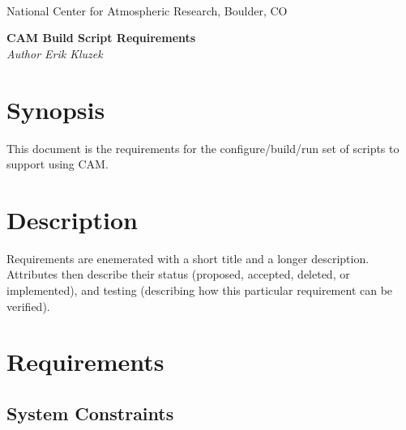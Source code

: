 \documentclass[]{article}
\begin{document}

\begin{titlepage}

\begin{latexonly}
 \\
\noindent National Center for Atmospheric Research, Boulder, CO \\
\vspace{2in}
\end{latexonly}

\begin{center}
{\Large\bf CAM Build Script Requirements} \\
\medskip
{\it Author Erik Kluzek}
\end{center}

\end{titlepage}

\tableofcontents

\newpage

\section{Synopsis}

This document is the requirements for the configure/build/run set of scripts
to support using CAM.

\section{Description}

Requirements are enemerated with a short title and a longer description. Attributes
then describe their status (proposed, accepted, deleted, or implemented), and
testing (describing how this particular requirement can be verified).

\section{Requirements}

\subsection{System Constraints}
\end{document}

